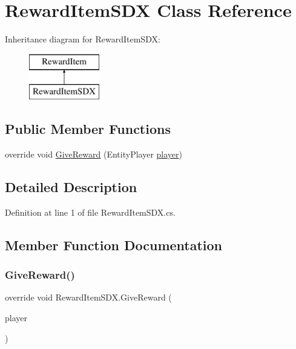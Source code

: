 \hypertarget{class_reward_item_s_d_x}{}\section{Reward\+Item\+S\+DX Class Reference}
\label{class_reward_item_s_d_x}
Inheritance diagram for Reward\+Item\+S\+DX\+:\begin{figure}[H]
\begin{center}
\leavevmode
\includegraphics[height=2.000000cm]{dd/d4c/class_reward_item_s_d_x}
\end{center}
\end{figure}
\subsection*{Public Member Functions}
\begin{DoxyCompactItemize}
\item 
override void \mbox{\hyperlink{class_reward_item_s_d_x_a60551dd7a63cc203433ae127aa5d3b36}{Give\+Reward}} (Entity\+Player \mbox{\hyperlink{_sphere_i_i_01_music_01_boxes_2_config_2_localization_8txt_a4e2cb8aeff651600ea1cc57fe5a929a4}{player}})
\end{DoxyCompactItemize}


\subsection{Detailed Description}


Definition at line 1 of file Reward\+Item\+S\+D\+X.\+cs.



\subsection{Member Function Documentation}
\mbox{\label{class_reward_item_s_d_x_a60551dd7a63cc203433ae127aa5d3b36}} 
\subsubsection{\texorpdfstring{GiveReward()}{GiveReward()}}
{\footnotesize\ttfamily override void Reward\+Item\+S\+D\+X.\+Give\+Reward (\begin{DoxyParamCaption}\item[{Entity\+Player}]{player }\end{DoxyParamCaption})}



